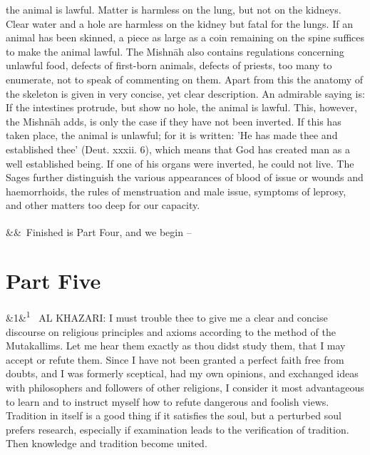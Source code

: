 \documentclass[12pt]{article}
\newcommand{\para}[1][]{\par\noindent\ifx&#1&\else\textsuperscript{\footnotesize #1}~\fi}
\begin{document}
the animal is lawful. Matter is harmless on the lung, but not on the kidneys. Clear water and a hole are harmless on the kidney but fatal for the lungs. If an animal has been skinned, a piece as large as a coin remaining on the spine suffices to make the animal lawful. The Mishnāh also contains regulations concerning unlawful food, defects of first-born animals, defects of priests, too many to enumerate, not to speak of commenting on them. Apart from this the anatomy of the skeleton is given in very concise, yet clear description. An admirable saying is: If the intestines protrude, but show no hole, the animal is lawful. This, however, the Mishnāh adds, is only the case if they have not been inverted. If this has taken place, the animal is unlawful; for it is written: 'He has made thee and established thee' (Deut. xxxii. 6), which means that God has created man as a well established being. If one of his organs were inverted, he could not live. The Sages further distinguish the various appearances of blood of issue or wounds and haemorrhoids, the rules of menstruation and male issue, symptoms of leprosy, and other matters too deep for our capacity.

\para Finished is Part Four, and we begin –

\section*{Part Five}

\para[1] AL KHAZARI: I must trouble thee to give me a clear and concise discourse on religious principles and axioms according to the method of the Mutakallims. Let me hear them exactly as thou didst study them, that I may accept or refute them. Since I have not been granted a perfect faith free from doubts, and I was formerly sceptical, had my own opinions, and exchanged ideas with philosophers and followers of other religions, I consider it most advantageous to learn and to instruct myself how to refute dangerous and foolish views. Tradition in itself is a good thing if it satisfies the soul, but a perturbed soul prefers research, especially if examination leads to the verification of tradition. Then knowledge and tradition become united.
\end{document}
